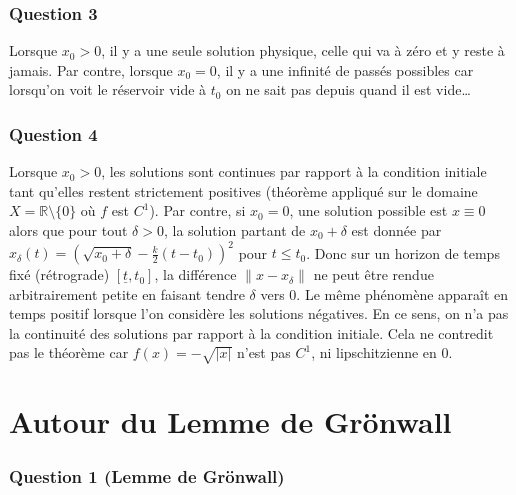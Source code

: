 \hypertarget{answer-tor-3}{%
\subsubsection*{Question 3}\label{answer-tor-3}}


Lorsque \(x_0>0\), il y a une seule solution physique, celle qui va à
zéro et y reste à jamais. Par contre, lorsque \(x_0=0\), il y a une
infinité de passés possibles car lorsqu'on voit le réservoir vide à
\(t_0\) on ne sait pas depuis quand il est vide\ldots{}

\hypertarget{answer-tor-4}{%
\subsubsection*{Question 4}\label{answer-tor-4}}


Lorsque \(x_0>0\), les solutions sont continues par rapport à la
condition initiale tant qu'elles restent strictement positives (théorème
appliqué sur le domaine \(X= \mathbb{R}\setminus \{0\}\) où \(f\) est
\(C^1\)). Par contre, si \(x_0=0\), une solution possible est
\(x\equiv 0\) alors que pour tout \(\delta>0\), la solution partant de
\(x_0+\delta\) est donnée par
\(x_\delta(t)=\left(\sqrt{x_0+\delta}-\frac{k}{2}(t-t_0)\right)^2\) pour
\(t\leq t_0\). Donc sur un horizon de temps fixé (rétrograde)
\([\underline{t},t_0]\), la différence \(\|x-x_\delta\|\) ne peut être
rendue arbitrairement petite en faisant tendre \(\delta\) vers 0. Le
même phénomène apparaît en temps positif lorsque l'on considère les
solutions négatives. En ce sens, on n'a pas la continuité des solutions
par rapport à la condition initiale. Cela ne contredit pas le théorème
car \(f(x)=-\sqrt{|x|}\) n'est pas \(C^1\), ni lipschitzienne en 0.

\hypertarget{correc_gronwall}{%
\section{Autour du Lemme de Grönwall}\label{correc_gronwall}}

\hypertarget{answer-gro-1}{%
\subsubsection*{Question 1 (Lemme de Grönwall)}\label{answer-gro-1}}

